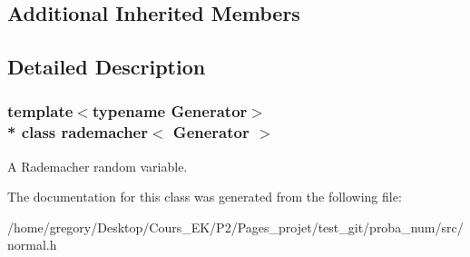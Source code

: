 \subsection*{Additional Inherited Members}


\subsection{Detailed Description}
\subsubsection*{template$<$typename Generator$>$\\*
class rademacher$<$ Generator $>$}

A Rademacher random variable. 

The documentation for this class was generated from the following file\+:\begin{DoxyCompactItemize}
\item 
/home/gregory/\+Desktop/\+Cours\+\_\+\+E\+K/\+P2/\+Pages\+\_\+projet/test\+\_\+git/proba\+\_\+num/src/normal.\+h\end{DoxyCompactItemize}
